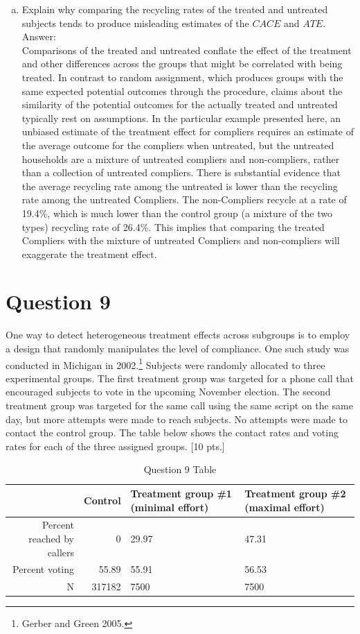 \documentclass[11pt,notitlepage]{article}\usepackage[]{graphicx}\usepackage[]{color}
\begin{document}
\begin{enumerate}[a)]
\item Explain why comparing the recycling rates of the treated and untreated subjects tends to produce misleading estimates of the $CACE$ and $ATE$.\\
Answer:\\
Comparisons of the treated and untreated conflate the effect of the treatment and other differences across the groups that might be correlated with being treated. In contrast to random assignment, which produces groups with the same expected potential outcomes through the procedure, claims about the similarity of the potential outcomes for the actually treated and untreated typically rest on assumptions. In the particular example presented here, an unbiased estimate of the treatment effect for compliers requires an estimate of the average outcome for the compliers when untreated, but the untreated households are a mixture of untreated compliers and non-compliers, rather than a collection of untreated compliers. There is substantial evidence that the average recycling rate among the untreated is lower than the recycling rate among the untreated Compliers. The non-Compliers recycle at a rate of 19.4\%, which is much lower than the control group (a mixture of the two types) recycling rate of 26.4\%. This implies that comparing the treated Compliers with the mixture of untreated Compliers and non-compliers will exaggerate the treatment effect. 
\end{enumerate}

\section*{Question 9}
One way to detect heterogeneous treatment effects across subgroups is to employ a design that randomly manipulates the level of compliance. One such study was conducted in Michigan in 2002.\footnote{Gerber and Green 2005.} Subjects were randomly allocated to three experimental groups. The first treatment group was targeted for a phone call that encouraged subjects to vote in the upcoming November election. The second treatment group was targeted for the same call using the same script on the same day, but more attempts were made to reach subjects. No attempts were made to contact the control group. The table below shows the contact rates and voting rates for each of the three assigned groups. [10 pts.]

\begin{table}[H]
  \centering
  \caption{Question 9 Table}
    \begin{tabular}{rrR{3.5cm}R{3.5cm}}
    \toprule
          & Control  & Treatment group \#1 (minimal effort)  & Treatment group \#2 (maximal effort)  \\
    \midrule
    Percent reached by callers  & 0     & 29.97 & 47.31 \\
    Percent voting  & 55.89 & 55.91 & 56.53 \\
    N     & 317182 & 7500  & 7500 \\
    \bottomrule
    \end{tabular}%
  \label{tab:addlabel}%
\end{table}%
\end{document}
